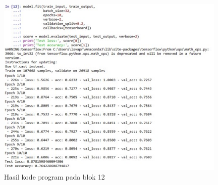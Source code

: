 \begin{enumerate}
\begin{figure}[!hbtp]
		\centering
		\includegraphics[scale=0.5]{figures/chapter7/andri12.jpg}
		\caption{Hasil kode program pada blok 12}
		\label{andri12}
		\end{figure}


\end{enumerate}
